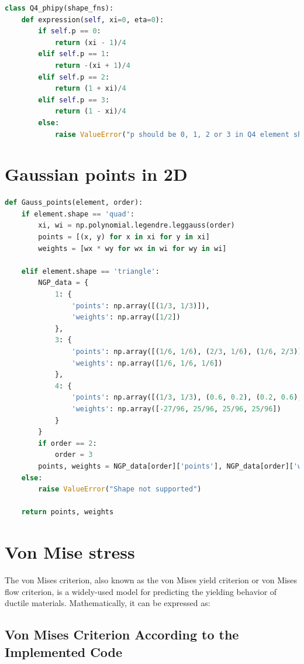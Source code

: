 \documentclass[twoside,twocolumn,10pt]{article}
\begin{document}
\begin{lstlisting}[language=Python, caption=Defeinitions of shape functions for T3 and Q4 elements]
class Q4_phipy(shape_fns):
    def expression(self, xi=0, eta=0):
        if self.p == 0:
            return (xi - 1)/4
        elif self.p == 1:
            return -(xi + 1)/4
        elif self.p == 2:
            return (1 + xi)/4
        elif self.p == 3:
            return (1 - xi)/4
        else:
            raise ValueError("p should be 0, 1, 2 or 3 in Q4 element shape functions, not {}".format(self.p))
\end{lstlisting}

\section{Gaussian points in 2D}
\label{Apdx:Gaussian_2D}
\begin{lstlisting}[language=Python, caption=Gaussian points in 2D]
  def Gauss_points(element, order):
    if element.shape == 'quad':
        xi, wi = np.polynomial.legendre.leggauss(order)
        points = [(x, y) for x in xi for y in xi]
        weights = [wx * wy for wx in wi for wy in wi]
        
    elif element.shape == 'triangle':
        NGP_data = {
            1: {
                'points': np.array([(1/3, 1/3)]),
                'weights': np.array([1/2])
            },
            3: {
                'points': np.array([(1/6, 1/6), (2/3, 1/6), (1/6, 2/3)]),
                'weights': np.array([1/6, 1/6, 1/6])
            },
            4: {
                'points': np.array([(1/3, 1/3), (0.6, 0.2), (0.2, 0.6), (0.2, 0.2)]),
                'weights': np.array([-27/96, 25/96, 25/96, 25/96])
            }
        }
        if order == 2:
            order = 3
        points, weights = NGP_data[order]['points'], NGP_data[order]['weights']
    else:
        raise ValueError("Shape not supported")

    return points, weights 
\end{lstlisting}


\section{Von Mise stress}
\label{Apdx:Von}

The von Mises criterion, also known as the von Mises yield criterion or von Mises flow criterion, is a widely-used model for predicting the yielding behavior of ductile materials. Mathematically, it can be expressed as:
\subsection*{Von Mises Criterion According to the Implemented Code}
\end{document}
